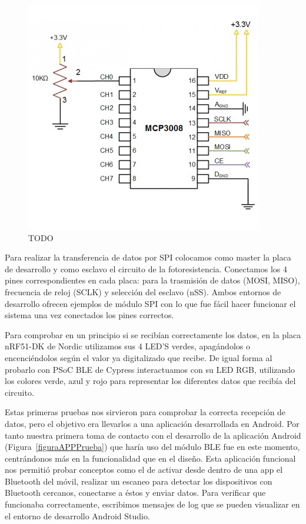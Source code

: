 \begin{figure}[h]%
	\centering
    \includegraphics{figures/mcp3008_esquema.PNG} %
    \caption[TODO]{TODO}
   	\label{figuraMCPEsquema}
\end{figure}

Para realizar la transferencia de datos por SPI colocamos como master la placa de desarrollo y como esclavo el circuito de la fotoresistencia. Conectamos los 4 pines correspondientes en cada placa: para la trasmisión de datos (MOSI, MISO), frecuencia de reloj (SCLK) y selección del esclavo (nSS). Ambos entornos de desarrollo ofrecen ejemplos de módulo SPI con lo que fue fácil hacer funcionar el sistema una vez conectados los pines correctos.

Para comprobar en un principio si se recibían correctamente los datos, en la placa nRF51-DK de Nordic utilizamos sus 4 LED’S verdes, apagándolos o encenciéndolos según el valor ya digitalizado que recibe. De igual forma al probarlo con PSoC BLE de Cypress interactuamos con su LED RGB, utilizando los colores verde, azul y rojo para representar los diferentes datos que recibía del circuito.

Estas primeras pruebas nos sirvieron para comprobar la correcta recepción de datos, pero el objetivo era llevarlos a una aplicación desarrollada en Android. Por tanto nuestra primera toma de contacto con el desarrollo de la aplicación Android (Figura~\ref{figuraAPPPrueba}) que haría uso del módulo BLE fue en este momento, centrándonos más en la funcionalidad  que en el diseño. Esta aplicación funcional nos permitió probar conceptos como el de activar desde dentro de una app el Bluetooth del móvil, realizar un escaneo para detectar los dispositivos con Bluetooth cercanos, conectarse a éstos y enviar datos. Para verificar que funcionaba correctamente, escribimos mensajes de log  que se pueden visualizar en el entorno de desarrollo Android Studio.

